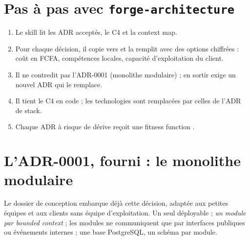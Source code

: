\section{Pas à pas avec \texttt{forge-architecture}}
\begin{enumerate}
  \item Le skill lit les ADR acceptés, le C4 et la context map.
  \item Pour chaque décision, il copie  vers  et la remplit avec des options chiffrées : coût en FCFA, compétences locales, capacité d'exploitation du client.
  \item Il ne contredit pas l'ADR-0001 (monolithe modulaire) ; en sortir exige un nouvel ADR qui le remplace.
  \item Il tient le C4 en code ; les technologies  sont remplacées par celles de l'ADR de stack.
  \item Chaque ADR à risque de dérive reçoit une fitness function .
\end{enumerate}

\section{L'ADR-0001, fourni : le monolithe modulaire}
Le dossier de conception embarque déjà cette décision, adaptée aux petites équipes et aux clients sans équipe d'exploitation.
Un seul déployable ; \emph{un module par bounded context} ; les modules ne communiquent que par interfaces publiques
ou événements internes ; une base PostgreSQL, un schéma par module.


